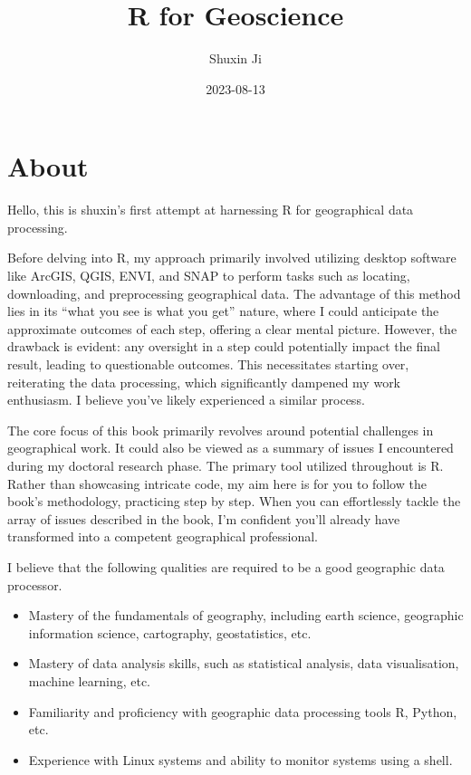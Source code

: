 \documentclass[
]{book}
\title{R for Geoscience}
\author{Shuxin Ji}
\date{2023-08-13}
\providecommand{\tightlist}{%
  \setlength{\itemsep}{0pt}\setlength{\parskip}{0pt}}
\begin{document}
\maketitle

{
\setcounter{tocdepth}{1}
\tableofcontents
}
\hypertarget{about}{%
\chapter*{About}\label{about}}

Hello, this is shuxin's first attempt at harnessing R for geographical data processing.

Before delving into R, my approach primarily involved utilizing desktop software like ArcGIS, QGIS, ENVI, and SNAP to perform tasks such as locating, downloading, and preprocessing geographical data. The advantage of this method lies in its ``what you see is what you get'' nature, where I could anticipate the approximate outcomes of each step, offering a clear mental picture. However, the drawback is evident: any oversight in a step could potentially impact the final result, leading to questionable outcomes. This necessitates starting over, reiterating the data processing, which significantly dampened my work enthusiasm. I believe you've likely experienced a similar process.

The core focus of this book primarily revolves around potential challenges in geographical work. It could also be viewed as a summary of issues I encountered during my doctoral research phase. The primary tool utilized throughout is R. Rather than showcasing intricate code, my aim here is for you to follow the book's methodology, practicing step by step. When you can effortlessly tackle the array of issues described in the book, I'm confident you'll already have transformed into a competent geographical professional.

I believe that the following qualities are required to be a good geographic data processor.

\begin{itemize}
\tightlist
\item
  Mastery of the fundamentals of geography, including earth science, geographic information science, cartography, geostatistics, etc.
\item
  Mastery of data analysis skills, such as statistical analysis, data visualisation, machine learning, etc.
\item
  Familiarity and proficiency with geographic data processing tools R, Python, etc.
\item
  Experience with Linux systems and ability to monitor systems using a shell.
\end{itemize}
\end{document}
